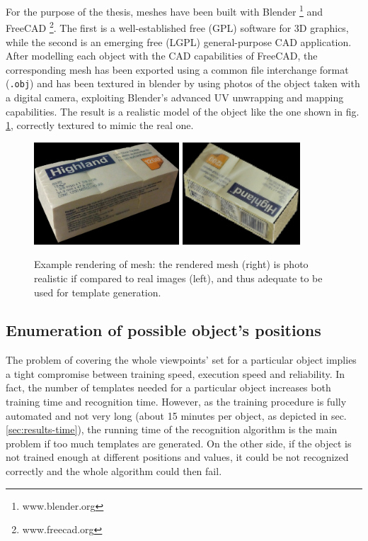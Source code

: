 For the purpose of the thesis, meshes have been built with Blender
\footnote{www.blender.org} and FreeCAD \footnote{www.freecad.org}. The first is a
well-established free (GPL) software for 3D graphics, while the second is an
emerging free (LGPL) general-purpose CAD application. After modelling each
object with the CAD capabilities of FreeCAD, the corresponding mesh has been
exported using a common file interchange format (\texttt{.obj}) and has been
textured in blender by using photos of the object taken with a digital camera,
exploiting Blender's advanced UV unwrapping and mapping capabilities. The result
is a realistic model of the object like the one shown in fig.
\ref{fig:realistic_rendering}, correctly textured to mimic the real one.

\begin{figure}[htbp] \label{fig:realistic_rendering}
\centering
\includegraphics[height=1.5in]{./Results/postit_photo}
\includegraphics[height=1.5in]{./Results/postit_render}
\caption{Example rendering of mesh: the rendered mesh (right) is photo realistic
  if compared to real images (left),
and thus adequate to be used for template generation.}
\end{figure}

\subsection{Enumeration of possible object's positions}
The problem of covering the whole viewpoints' set for a particular object
implies a tight compromise between training speed, execution speed and
reliability. In fact, the number of templates needed for a particular object increases
both training time and recognition time. However, as the training procedure is
fully automated and not very long (about 15 minutes per object, as depicted in sec.
\ref{sec:results-time}), %
the running time of the recognition algorithm is the main problem if too much
templates are generated. On the other side, if the object is not trained enough
at different positions and values, it could be not recognized correctly and the
whole algorithm could then fail.

